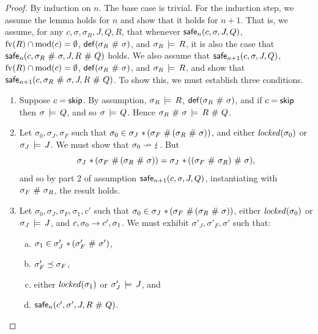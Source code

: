 \documentclass[11pt]{report}
\begin{document}
\begin{proof}
	By induction on $n$. The base case is trivial. For the induction step, we assume the lemma holds for $n$ and show that it holds for $n+1$. That is, we assume, for any $c,\sigma,\sigma_R,J,Q,R$, that whenever $\mathsf{safe}_{n}(c,\sigma,J,Q)$, $\mathrm{fv}(R) \cap \mathrm{mod}(c) = \operatorname{\emptyset}$, $\mathsf{def}(\sigma_R \operatorname{\,\#\,} \sigma)$, and $\sigma_R \,\models\, R$, it is also the case that $\mathsf{safe}_{n}(c,\sigma_R \operatorname{\,\#\,} \sigma,J,R \operatorname{\,\#\,} Q)$ holds. We also assume that $\mathsf{safe}_{n+1}(c,\sigma,J,Q)$, $\mathrm{fv}(R) \cap \mathrm{mod}(c) = \operatorname{\emptyset}$, $\mathsf{def}(\sigma_R \operatorname{\,\#\,} \sigma)$, and $\sigma_R \,\models\, R$, and show that \\ 
	$\mathsf{safe}_{n+1}(c,\sigma_R \operatorname{\,\#\,} \sigma,J,R \operatorname{\,\#\,} Q)$. To show this, we must establish three conditions. 

	\begin{enumerate}
		\item Suppose $c = \operatorname{\mathsf{skip}}$. By assumption, $\sigma_R \,\models\, R$, $\mathsf{def}(\sigma_R \operatorname{\,\#\,} \sigma)$, and if $c = \operatorname{\mathsf{skip}}$ then $\sigma \,\models\, Q$, and so $\sigma \,\models\, Q$. Hence $\sigma_R \operatorname{\,\#\,} \sigma \,\models\, R \operatorname{\,\#\,} Q$. 

		\item Let $\sigma_0,\sigma_J,\sigma_F$ such that $\sigma_0 \in \sigma_J \operatorname{\,\ast\,} (\sigma_F \operatorname{\,\#\,} (\sigma_R \operatorname{\,\#\,} \sigma))$, and either $\mathit{locked}(\sigma_0)$ or $\sigma_J \,\models\, J$. We must show that $\sigma_0 \nrightarrow \lightning$. But \[ \sigma_J \operatorname{\,\ast\,} (\sigma_F \operatorname{\,\#\,} (\sigma_R \operatorname{\,\#\,} \sigma)) = \sigma_J \operatorname{\,\ast\,} ((\sigma_F \operatorname{\,\#\,} \sigma_R) \operatorname{\,\#\,} \sigma),\] and so by part 2 of assumption $\mathsf{safe}_{n+1}(c,\sigma,J,Q)$, instantiating with $\sigma_F \operatorname{\,\#\,} \sigma_R$, the result holds. 

		\item Let $\sigma_0,\sigma_J,\sigma_F,\sigma_1,c'$ such that $\sigma_0 \in \sigma_J \operatorname{\,\ast\,} (\sigma_F \operatorname{\,\#\,} (\sigma_R \operatorname{\,\#\,} \sigma))$, either $\mathit{locked}(\sigma_0)$ or $\sigma_J \,\models\, J$, and $c,\sigma_0 \rightarrow c',\sigma_1$. We must exhibit $\sigma'_J,\sigma'_F,\sigma'$ such that: \begin{enumerate}[(a)]
			\item $\sigma_1 \in \sigma'_J \operatorname{\,\ast\,} (\sigma'_F \operatorname{\,\#\,} \sigma')$,
			\item $\sigma'_F \preceq \sigma_F$, 
			\item either $\mathit{locked}(\sigma_1)$ or $\sigma'_J \,\models\, J$, and
			\item $\mathsf{safe}_{n}(c',\sigma',J,R \operatorname{\,\#\,} Q)$. 
		\end{enumerate}


\end{enumerate}
\end{proof}
\end{document}
